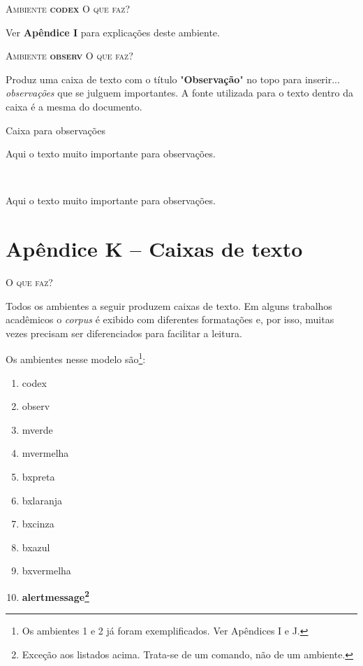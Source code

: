 \newpage
\textsc{Ambiente \textbf{codex}}
\noindent\textsc{O que faz?}

Ver \textbf{Apêndice I} para explicações deste ambiente.

\textsc{Ambiente \textbf{observ}}
\noindent\textsc{O que faz?}

Produz uma caixa de texto com o título "\textbf{Observação}" no topo para inserir... \textit{observações} que se julguem importantes. A fonte utilizada para o texto dentro da caixa é a mesma do documento.

\begin{codex}{Caixa para observações}
    \begin{observ}
        Aqui o texto muito importante para observações.
    \end{observ}
\end{codex}
\ \\

\begin{observ}
        Aqui o texto muito importante para observações.
    \end{observ}


\chapter*{Apêndice K -- Caixas de texto}

\noindent\textsc{O que faz?}

Todos os ambientes a seguir produzem caixas de texto. Em alguns trabalhos acadêmicos o \textit{corpus} é exibido com diferentes formatações e, por isso, muitas vezes precisam ser diferenciados para facilitar a leitura. 

Os ambientes nesse modelo são\footnote{Os ambientes 1 e 2 já foram exemplificados. Ver Apêndices I e J.}:

\begin{enumerate}
    \item codex
    \item observ
    \item mverde
    \item mvermelha
    \item bxpreta
    \item bxlaranja
    \item bxcinza
    \item bxazul
    \item bxvermelha
    \item \textbf{alertmessage\footnote{Exceção aos listados acima. Trata-se de um comando, não de um ambiente.}}
\end{enumerate}

